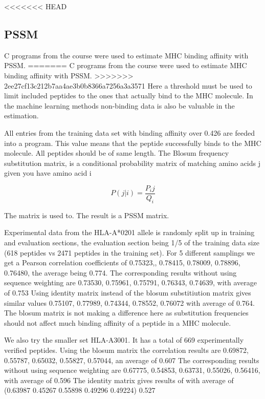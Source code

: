 
<<<<<<< HEAD
\subsection*{PSSM}

C programs from the course were used to estimate MHC binding affinity with PSSM. 
=======
C programs from the course were used to estimate MHC binding affinity with PSSM.
>>>>>>> 2ee27cf13c212b7aa4ae3b0b8366a7256a3a3571
Here a threshold must be used to limit included peptides to the ones that actually bind to the MHC molecule. 
In the machine learning methods non-binding data is also be valuable in the estimation.

All entries from the training data set with binding affinity over 0.426 are feeded into a program. 
This value means that the peptide successfully binds to the MHC molecule. All peptides should be of same length.
The Blosum frequency substitution matrix, is a
conditional probability matrix of matching amino
acids j given you have amino acid i

\begin{equation}
P(j|i) = \frac{P_ij}{Q_i}
\end{equation}

The matrix is used to. The result is a PSSM matrix. 

Experimental data from the HLA-A*0201 allele is randomly split up in training and evaluation sections, the evaluation section being 1/5 of the training data size (618 peptides vs 2471 peptides in the training set).
For 5 different samplings we get a Pearson correlation coefficients of {0.75323,, 0.78415, 0.78009, 0.78896, 0.76480}, the average being 0.774.
The corresponding results without using sequence weighting are {0.73530, 0.75961, 0.75791, 0.76343, 0.74639}, with average of 0.753
Using identity matrix instead of the blosum substitiution matrix gives similar values {0.75107, 0.77989, 0.74344, 0.78552, 0.76072} with average of 0.764.
The blosum matrix is not making a difference here as substitution frequencies should not affect much binding affinity of a peptide in a MHC molecule.

We also try the smaller set HLA-A3001. It has a total of 669 experimentally verified peptides.
Using the blosum matrix the correlation results are {0.69872, 0.55787, 0.65032, 0.55827, 0.57044}, an average of 0.607
The corresponding results without using sequence weighting are {0.67775, 0.54853, 0.63731, 0.55026, 0.56416}, with average of 0.596
The identity matrix gives results of with average of (0.63987 0.45267 0.55898 0.49296 0.49224) 0.527 

